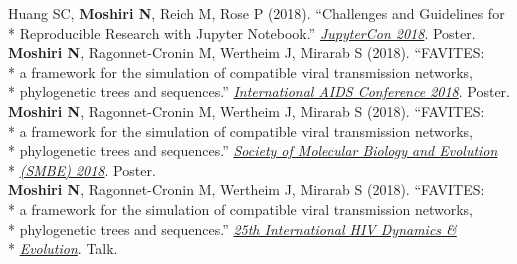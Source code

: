 \documentclass[margin,line]{res}
\begin{document}
\begin{resume}
\hspace*{4mm} Huang SC, \textbf{Moshiri N}, Reich M, Rose P (2018). ``Challenges and Guidelines for\\*\vspace{2mm}
\hspace*{8mm} Reproducible Research with Jupyter Notebook.'' \href{https://conferences.oreilly.com/jupyter/jup-ny}{\textit{JupyterCon 2018}}. Poster.\\
\hspace*{4mm} \textbf{Moshiri N}, Ragonnet-Cronin M, Wertheim J, Mirarab S (2018). ``FAVITES:\\*
\hspace*{9mm} a framework for the simulation of compatible viral transmission networks,\\*\vspace{2mm}
\hspace*{8mm} phylogenetic trees and sequences.'' \href{https://www.aids2018.org/}{\textit{International AIDS Conference 2018}}. Poster.\\
\hspace*{4mm} \textbf{Moshiri N}, Ragonnet-Cronin M, Wertheim J, Mirarab S (2018). ``FAVITES:\\*
\hspace*{9mm} a framework for the simulation of compatible viral transmission networks,\\*
\hspace*{9mm} phylogenetic trees and sequences.'' \href{https://smbe.org/smbe/SMBE2018Meeting/}{\textit{Society of Molecular Biology and Evolution}}\\*\vspace{2mm}
\hspace*{8mm} \href{https://smbe.org/smbe/SMBE2018Meeting/}{\textit{(SMBE) 2018}}. Poster.\\
\hspace*{4mm} \textbf{Moshiri N}, Ragonnet-Cronin M, Wertheim J, Mirarab S (2018). ``FAVITES:\\*
\hspace*{9mm} a framework for the simulation of compatible viral transmission networks,\\*
\hspace*{9mm} phylogenetic trees and sequences.'' \href{https://cme.ucsd.edu/hivdynamics/}{\textit{25th International HIV Dynamics \&}}\\*\vspace{2mm}
\hspace*{8mm} \href{https://cme.ucsd.edu/hivdynamics/}{\textit{Evolution}}. Talk.\\

\end{resume}
\end{document}
